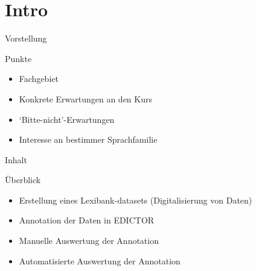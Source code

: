 \section{Intro}

\begin{frame}{Vorstellung}
	\begin{block}{Punkte}
		\begin{itemize}
			\item Fachgebiet
			\item Konkrete Erwartungen an den Kurs
			\item `Bitte-nicht'-Erwartungen
			\item Interesse an bestimmer Sprachfamilie
		\end{itemize}
	\end{block}
\end{frame}


\begin{frame}{Inhalt}
	\begin{block}{Überblick}
		\begin{itemize}
			\item Erstellung eines Lexibank-datasets (Digitalisierung von Daten)
			\item Annotation der Daten in EDICTOR
			\item Manuelle Auswertung der Annotation
			\item Automatisierte Auswertung der Annotation
		\end{itemize}
	\end{block}
\end{frame}


